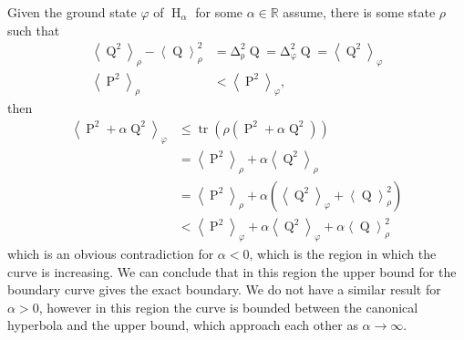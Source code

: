 \documentclass[prb,amsmath,amssymb,notitlepage]{revtex4-1}
\newcommand{\var}[2]{\operatorname{\Delta^{\!2}_{{#2}}} #1}
\newcommand{\expe}[2]{\left\langle #1\right\rangle_{#2}}
\newcommand{\ketbra}[2]{\left| #1 \middle\rangle\middle\langle #2 \right|}
\newcommand{\dop}[1]{\mathcal{S}\left(#1\right)}
\DeclareMathOperator{\tr}{tr}
\DeclareMathOperator{\opp}{P}
\DeclareMathOperator{\opq}{Q}
\DeclareMathOperator{\oph}{H}
\begin{document}
Given the ground state $\varphi$ of $\oph_\alpha$ for some $\alpha \in\mathbb{R}$ assume, there is some state $\rho$ such that
\begin{align}
	\expe{\opq^2}{\rho} -\expe{\opq}{\rho}^2 &= \var{\opq}{\rho} = \var{\opq}{\varphi} = \expe{\opq^2}{\varphi}\\
	\expe{\opp^2}{\rho} &< \expe{\opp^2}{\varphi},
\end{align}
then
\begin{align}
	\expe{\opp^2 +\alpha\opq^2}{\varphi} &\leq \tr\left(\rho\left(\opp^2 +\alpha\opq^2\right)\right)\\
	&= \expe{\opp^2}{\rho} + \alpha\expe{\opq^2}{\rho}\\
	&= \expe{\opp^2}{\rho} + \alpha\left(\expe{\opq^2}{\varphi} + \expe{\opq}{\rho}^2\right)\\
	&< \expe{\opp^2}{\varphi} + \alpha\expe{\opq^2}{\varphi} + \alpha\expe{\opq}{\rho}^2
\end{align}
which is an obvious contradiction for $\alpha < 0$, which is the region in which the curve is increasing. We can conclude that in this region the upper bound for the boundary curve gives the exact boundary. We do not have a similar result for $\alpha > 0$, however in this region the curve is bounded between the canonical hyperbola and the upper bound, which approach each other as $\alpha\to\infty$.

%
%
%
%
%
%
\end{document}
